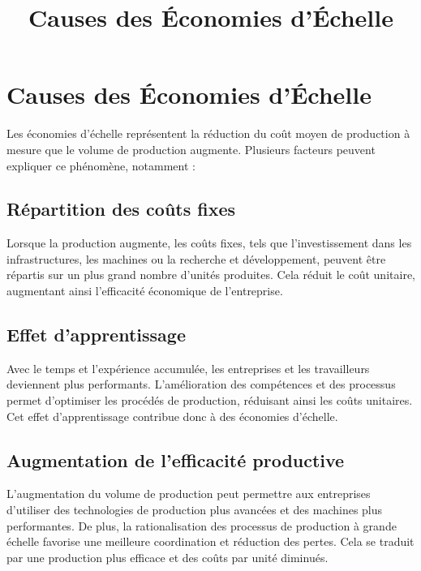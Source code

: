 \documentclass{article}
\title{Causes des Économies d'Échelle}
\author{}
\date{}
\begin{document}
\maketitle

\section{Causes des Économies d'Échelle}

Les économies d'échelle représentent la réduction du coût moyen de production à mesure que le volume de production augmente. Plusieurs facteurs peuvent expliquer ce phénomène, notamment :

\subsection{Répartition des coûts fixes}

Lorsque la production augmente, les coûts fixes, tels que l'investissement dans les infrastructures, les machines ou la recherche et développement, peuvent être répartis sur un plus grand nombre d'unités produites. Cela réduit le coût unitaire, augmentant ainsi l'efficacité économique de l'entreprise.

\subsection{Effet d'apprentissage}

Avec le temps et l'expérience accumulée, les entreprises et les travailleurs deviennent plus performants. L'amélioration des compétences et des processus permet d'optimiser les procédés de production, réduisant ainsi les coûts unitaires. Cet effet d'apprentissage contribue donc à des économies d'échelle.

\subsection{Augmentation de l'efficacité productive}

L'augmentation du volume de production peut permettre aux entreprises d'utiliser des technologies de production plus avancées et des machines plus performantes. De plus, la rationalisation des processus de production à grande échelle favorise une meilleure coordination et réduction des pertes. Cela se traduit par une production plus efficace et des coûts par unité diminués.
\end{document}
